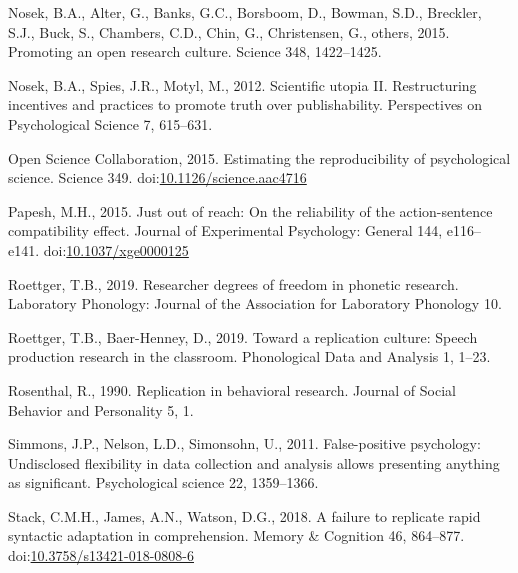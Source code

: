 \documentclass[]{elsarticle} %
\newlength{\cslhangindent}
\newlength{\cslentryspacingunit} %
\newenvironment{CSLReferences}[2] %
 {%
  \setlength{\parindent}{0pt}
  \ifodd #1
  \let\oldpar\par
  \def\par{\hangindent=\cslhangindent\oldpar}
  \fi
  \setlength{\parskip}{#2\cslentryspacingunit}
 }%
 {}
\begin{document}
\begin{CSLReferences}{1}{0}
\leavevmode{}%
Nosek, B.A., Alter, G., Banks, G.C., Borsboom, D., Bowman, S.D., Breckler, S.J., Buck, S., Chambers, C.D., Chin, G., Christensen, G., others, 2015. Promoting an open research culture. Science 348, 1422--1425.

\leavevmode{}%
Nosek, B.A., Spies, J.R., Motyl, M., 2012. Scientific utopia {II}. {Restructuring} incentives and practices to promote truth over publishability. Perspectives on Psychological Science 7, 615--631.

\leavevmode{}%
Open Science Collaboration, 2015. Estimating the reproducibility of psychological science. Science 349. doi:\href{https://doi.org/10.1126/science.aac4716}{10.1126/science.aac4716}

\leavevmode{}%
Papesh, M.H., 2015. Just out of reach: {On} the reliability of the action-sentence compatibility effect. Journal of Experimental Psychology: General 144, e116--e141. doi:\href{https://doi.org/10.1037/xge0000125}{10.1037/xge0000125}

\leavevmode{}%
Roettger, T.B., 2019. Researcher degrees of freedom in phonetic research. Laboratory Phonology: Journal of the Association for Laboratory Phonology 10.

\leavevmode{}%
Roettger, T.B., Baer-Henney, D., 2019. Toward a replication culture: {Speech} production research in the classroom. Phonological Data and Analysis 1, 1--23.

\leavevmode{}%
Rosenthal, R., 1990. Replication in behavioral research. Journal of Social Behavior and Personality 5, 1.

\leavevmode{}%
Simmons, J.P., Nelson, L.D., Simonsohn, U., 2011. False-positive psychology: Undisclosed flexibility in data collection and analysis allows presenting anything as significant. Psychological science 22, 1359--1366.

\leavevmode{}%
Stack, C.M.H., James, A.N., Watson, D.G., 2018. A failure to replicate rapid syntactic adaptation in comprehension. Memory \& Cognition 46, 864--877. doi:\href{https://doi.org/10.3758/s13421-018-0808-6}{10.3758/s13421-018-0808-6}


\end{CSLReferences}
\end{document}
